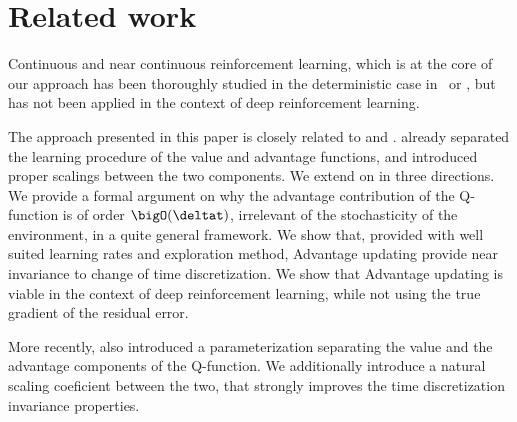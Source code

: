 \section{Related work}
\label{sec:related}
Continuous and near continuous reinforcement learning, which is at the core of
our approach has been thoroughly studied in the deterministic case
in~\cite{adv_upd} or \cite{cont_rl}, but has not been applied in the context of
deep reinforcement learning.

The approach presented in this paper is closely related to \cite{adv_upd} and
\cite{cont_rl}. \cite{adv_upd} already separated the learning procedure of the
value and advantage functions, and introduced proper scalings between the two
components. We extend on \cite{adv_upd} in three directions. We provide a
formal argument on why the advantage contribution of the Q-function is of order
$\bigO(\deltat)$, irrelevant of the stochasticity of the environment, in a quite
general framework. We show that, provided with well suited learning rates and
exploration method, Advantage updating provide near invariance to change of time
discretization. We show that Advantage updating is viable in the context of deep
reinforcement learning, while not using the true gradient of the residual error.

More recently, \cite{dueling_nets} also introduced a parameterization separating
the value and the advantage components of the Q-function. We additionally
introduce a natural scaling coeficient between the two, that strongly improves
the time discretization invariance properties.

